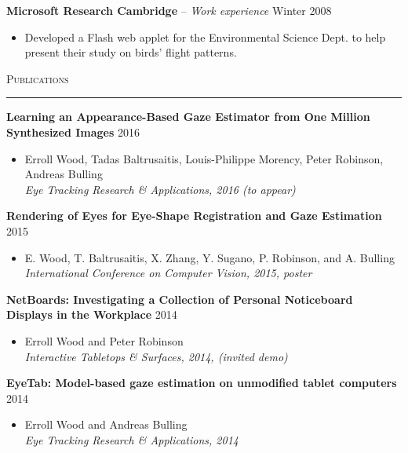 \documentclass{article}
\begin{document}
\textbf{Microsoft Research Cambridge} -- \emph{Work experience} \hfill Winter 2008 \\[-6mm]
\begin{itemize}
  \item[] Developed a Flash web applet for the Environmental Science Dept. to help present their study on birds' flight patterns.
\end{itemize} \bigskip

\textsc{Publications} \smallskip \hrule \smallskip

\textbf{Learning an Appearance-Based Gaze Estimator from One Million Synthesized Images} \hfill 2016 \\[-6mm]
\begin{itemize}
  \item[] Erroll Wood, Tadas Baltrusaitis, Louis-Philippe Morency, Peter Robinson, Andreas Bulling \\
  \emph{Eye Tracking Research \& Applications, 2016 (to appear)}
\end{itemize} \smallskip

\textbf{Rendering of Eyes for Eye-Shape Registration and Gaze Estimation} \hfill 2015 \\[-6mm]
\begin{itemize}
  \item[] E. Wood, T. Baltrusaitis, X. Zhang, Y. Sugano, P. Robinson, and A. Bulling \\
  \emph{International Conference on Computer Vision, 2015, poster}
\end{itemize} \smallskip

\textbf{NetBoards: Investigating a Collection of Personal Noticeboard Displays in the Workplace} \hfill 2014 \\[-6mm]
\begin{itemize}
  \item[] Erroll Wood and Peter Robinson \\
  \emph{Interactive Tabletops \& Surfaces, 2014, (invited demo)}
\end{itemize} \smallskip

\textbf{EyeTab: Model-based gaze estimation on unmodified tablet computers} \hfill  2014 \\[-6mm]
\begin{itemize}
  \item[] Erroll Wood and Andreas Bulling \\
  \emph{Eye Tracking Research \& Applications, 2014}
\end{itemize} \bigskip
\end{document}
